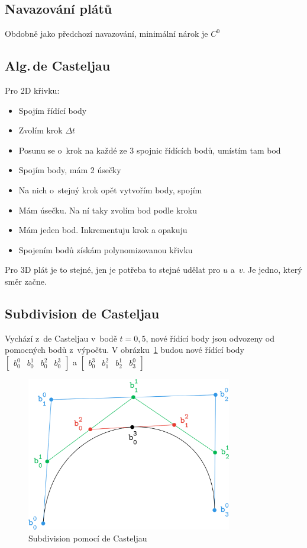 \subsection{Navazování plátů}
Obdobně jako předchozí navazování, minimální nárok je \(C^0\)

\subsection{Alg.\,de Casteljau}
Pro 2D křivku:
\begin{itemize}
    \item Spojím řídící body
    \item Zvolím krok \(\Delta t\)
    \item Posunu se o~krok na každé ze 3 spojnic řídících bodů, umístím tam bod
    \item Spojím body, mám 2 úsečky
    \item Na nich o~stejný krok opět vytvořím body, spojím
    \item Mám úsečku. Na ní taky zvolím bod podle kroku
    \item Mám jeden bod. Inkrementuju krok a opakuju
    \item Spojením bodů získám polynomizovanou křivku
\end{itemize}

Pro 3D plát je to stejné, jen je potřeba to stejné udělat pro \(u\) a~\(v\). Je jedno, který směr začne.

\subsection{Subdivision de Casteljau}
Vychází z~de Casteljau v~bodě \(t=0,5\), nové řídící body jsou odvozeny od pomocných bodů z~výpočtu. V obrázku~\ref{fig:subdivision-decasteljau} budou nové řídící body \(\begin{bmatrix}
    b_0^0 & b_0^1 & b_0^2 & b_0^3
\end{bmatrix}\) a \(\begin{bmatrix}
    b_0^3 & b_1^2 & b_2^1 & b_3^0
\end{bmatrix}\)

\begin{figure}
    \centering
    \includegraphics[width=0.8\textwidth]{obrazky/deCasteljau.png}
    \caption{Subdivision pomocí de Casteljau}
    \label{fig:subdivision-decasteljau}
\end{figure}

